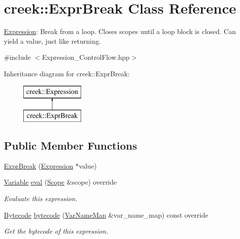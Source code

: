 \hypertarget{classcreek_1_1_expr_break}{}\section{creek\+:\+:Expr\+Break Class Reference}
\label{classcreek_1_1_expr_break}


\hyperlink{classcreek_1_1_expression}{Expression}\+: Break from a loop. Closes scopes until a loop block is closed. Can yield a value, just like returning.  




{\ttfamily \#include $<$Expression\+\_\+\+Control\+Flow.\+hpp$>$}

Inheritance diagram for creek\+:\+:Expr\+Break\+:\begin{figure}[H]
\begin{center}
\leavevmode
\includegraphics[height=2.000000cm]{classcreek_1_1_expr_break}
\end{center}
\end{figure}
\subsection*{Public Member Functions}
\begin{DoxyCompactItemize}
\item 
\hyperlink{classcreek_1_1_expr_break_ae0f196578ee90ace445ad5be892968c6}{Expr\+Break} (\hyperlink{classcreek_1_1_expression}{Expression} $\ast$value)
\item 
\hyperlink{classcreek_1_1_variable}{Variable} \hyperlink{classcreek_1_1_expr_break_a1111901c96f12e26e1ce3c483f2a7af5}{eval} (\hyperlink{classcreek_1_1_scope}{Scope} \&scope) override
\begin{DoxyCompactList}\small\item\em Evaluate this expression. \end{DoxyCompactList}\item 
\hyperlink{classcreek_1_1_bytecode}{Bytecode} \hyperlink{classcreek_1_1_expr_break_a95561cf19b579449205702d5e1a2028a}{bytecode} (\hyperlink{classcreek_1_1_var_name_map}{Var\+Name\+Map} \&var\+\_\+name\+\_\+map) const  override\hypertarget{classcreek_1_1_expr_break_a95561cf19b579449205702d5e1a2028a}{}\label{classcreek_1_1_expr_break_a95561cf19b579449205702d5e1a2028a}

\begin{DoxyCompactList}\small\item\em Get the bytecode of this expression. \end{DoxyCompactList}\end{DoxyCompactItemize}


